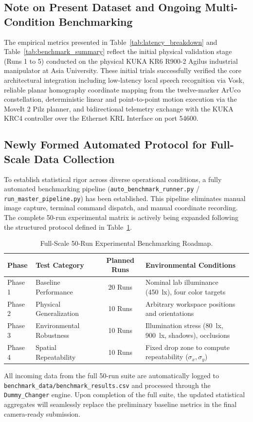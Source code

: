 \documentclass[runningheads]{llncs}
\begin{document}
\subsection*{Note on Present Dataset and Ongoing Multi-Condition Benchmarking}
The empirical metrics presented in Table~\ref{tab:latency_breakdown} and Table~\ref{tab:benchmark_summary} reflect the initial physical validation stage (Runs 1 to 5) conducted on the physical KUKA KR6 R900-2 Agilus industrial manipulator at Asia University. These initial trials successfully verified the core architectural integration including low-latency local speech recognition via Vosk, reliable planar homography coordinate mapping from the twelve-marker ArUco constellation, deterministic linear and point-to-point motion execution via the MoveIt 2 Pilz planner, and bidirectional telemetry exchange with the KUKA KRC4 controller over the Ethernet KRL Interface on port 54600.

\subsection*{Newly Formed Automated Protocol for Full-Scale Data Collection}
To establish statistical rigor across diverse operational conditions, a fully automated benchmarking pipeline (\texttt{auto\_benchmark\_runner.py} / \texttt{run\_master_pipeline.py}) has been established. This pipeline eliminates manual image capture, terminal command dispatch, and manual coordinate recording. The complete 50-run experimental matrix is actively being expanded following the structured protocol defined in Table~\ref{tab:protocol_roadmap}.

\begin{table}[h!]
\caption{Full-Scale 50-Run Experimental Benchmarking Roadmap.}
\label{tab:protocol_roadmap}
\centering
\begin{tabular}{llcl}
\toprule
\textbf{Phase} & \textbf{Test Category} & \textbf{Planned Runs} & \textbf{Environmental Conditions} \\
\midrule
Phase 1 & Baseline Performance & 20 Runs & Nominal lab illuminance (\SI{450}{\lux}), four color targets \\
Phase 2 & Physical Generalization & 10 Runs & Arbitrary workspace positions and orientations \\
Phase 3 & Environmental Robustness & 10 Runs & Illumination stress (\SI{80}{\lux}, \SI{900}{\lux}, shadows), occlusions \\
Phase 4 & Spatial Repeatability & 10 Runs & Fixed drop zone to compute repeatability ($\sigma_x, \sigma_y$) \\
\bottomrule
\end{tabular}
\end{table}

All incoming data from the full 50-run suite are automatically logged to \texttt{benchmark\_data/benchmark\_results.csv} and processed through the \texttt{Dummy\_Changer} engine. Upon completion of the full suite, the updated statistical aggregates will seamlessly replace the preliminary baseline metrics in the final camera-ready submission.
\end{document}
